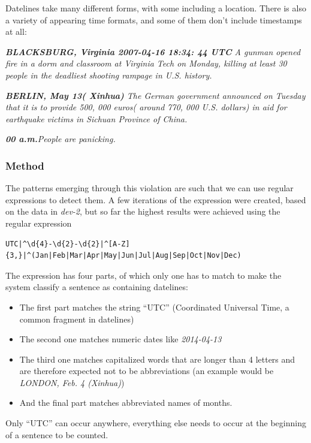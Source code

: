 \documentclass[a4paper,10pt]{scrartcl}
\theoremstyle{style}
\begin{document}
Datelines take many different forms, with some including a location. There is also a variety of appearing time formats, and some of them don't include timestamps at all:

\quad\textit{\textbf{BLACKSBURG, Virginia 2007-04-16 18:34: 44 UTC} A gunman opened fire in a dorm and classroom at Virginia Tech on Monday, killing at least 30 people in the deadliest shooting rampage in U.S. history.}

\quad\textit{\textbf{BERLIN, May 13( Xinhua)} The German government announced on Tuesday that it is to provide 500, 000 euros( around 770, 000 U.S. dollars) in aid for earthquake victims in Sichuan Province of China.}

\quad\textit{\textbf{00 a.m.}People are panicking.}

\subsubsection{Method}
The patterns emerging through this violation are such that we can use regular expressions to detect them. A few iterations of the expression were created, based on the data in \textit{dev-2}, but so far the highest results were achieved using the regular expression

\begin{lstlisting}
UTC|^\d{4}-\d{2}-\d{2}|^[A-Z]{3,}|^(Jan|Feb|Mar|Apr|May|Jun|Jul|Aug|Sep|Oct|Nov|Dec)
\end{lstlisting}

The expression has four parts, of which only one has to match to make the system classify a sentence as containing datelines:

\begin{itemize}
\item The first part matches the string ``UTC'' (Coordinated Universal Time, a common fragment in datelines)
\item The second one matches numeric dates like \textit{2014-04-13}
\item The third one matches capitalized words that are longer than 4 letters and are therefore expected not to be abbreviations (an example would be \textit{LONDON, Feb. 4 (Xinhua)})
\item And the final part matches abbreviated names of months.
\end{itemize}

Only ``UTC'' can occur anywhere, everything else needs to occur at the beginning of a sentence to be counted.
\end{document}
